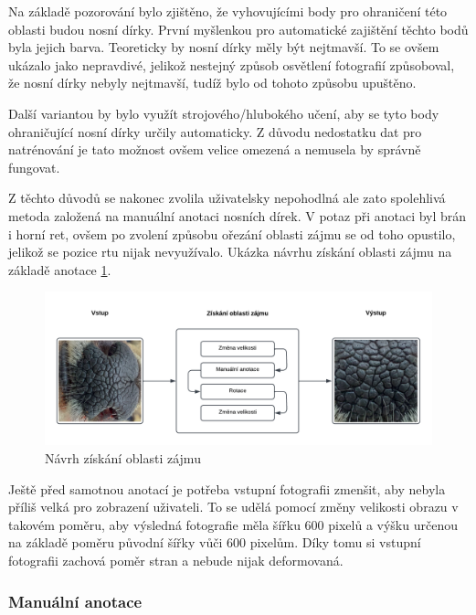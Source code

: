 Na základě pozorování bylo zjištěno, že vyhovujícími body pro ohraničení této oblasti budou nosní dírky. První myšlenkou pro automatické zajištění těchto bodů byla jejich barva. Teoreticky by nosní dírky měly být nejtmavší. To se ovšem ukázalo jako nepravdivé, jelikož nestejný způsob osvětlení fotografií způsoboval, že nosní dírky nebyly nejtmavší, tudíž bylo od tohoto způsobu upuštěno. 

Další variantou by bylo využít strojového/hlubokého učení, aby se tyto body ohraničující nosní dírky určily automaticky. Z důvodu nedostatku dat pro natrénování je tato možnost ovšem velice omezená a nemusela by správně fungovat.

Z těchto důvodů se nakonec zvolila uživatelsky nepohodlná ale zato spolehlivá metoda založená na manuální anotaci nosních dírek. V potaz při anotaci byl brán i horní ret, ovšem po zvolení způsobu ořezání oblasti zájmu se od toho opustilo, jelikož se pozice rtu nijak nevyužívalo. Ukázka návrhu získání oblasti zájmu na základě anotace \ref{ziskaniROI}.

\newpage
\begin{figure}[h]
	\centering
	\includegraphics[width=1\textwidth]{obrazky/ziskani_oblasti.png}
	\caption{Návrh získání oblasti zájmu}
	\label{ziskaniROI}
\end{figure}

Ještě před samotnou anotací je potřeba vstupní fotografii zmenšit, aby nebyla příliš velká pro zobrazení uživateli. To se udělá pomocí změny velikosti obrazu v takovém poměru, aby výsledná fotografie měla šířku 600 pixelů a výšku určenou na základě poměru původní šířky vůči 600 pixelům. Díky tomu si vstupní fotografii zachová poměr stran a nebude nijak deformovaná.

\subsubsection{Manuální anotace}

